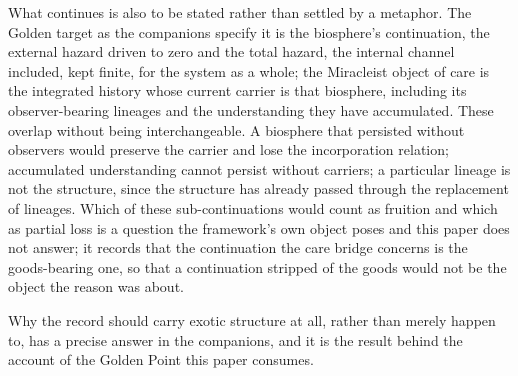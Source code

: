 What continues is also to be stated rather than settled by a metaphor. The
Golden target as the companions specify it is the biosphere's continuation,
the external hazard driven to zero and the total hazard, the internal
channel included, kept finite, for the system as a whole; the Miracleist
object of care is the integrated history whose current carrier is that
biosphere, including its observer-bearing lineages and the understanding they
have accumulated. These overlap without being interchangeable. A biosphere that persisted without
observers would preserve the carrier and lose the incorporation relation;
accumulated understanding cannot persist without carriers; a particular
lineage is not the structure, since the structure has already passed through
the replacement of lineages. Which of these sub-continuations would count as
fruition and which as partial loss is a question the framework's own object
poses and this paper does not answer; it records that the continuation the
care bridge concerns is the goods-bearing one, so that a continuation stripped
of the goods would not be the object the reason was about.

Why the record should carry exotic structure at all, rather than merely
happen to, has a precise answer in the companions, and it is the result
behind the account of the Golden Point this paper consumes.

